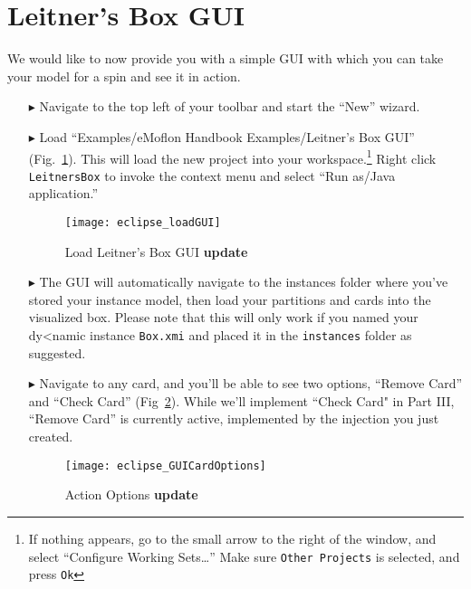 \newpage
\section{Leitner's Box GUI}
\genHeader
\hypertarget{sec:LBGUI}{}


We would like to now provide you with a simple GUI with which you can take your model for a spin and see it in action.

\begin{itemize}

\item[$\blacktriangleright$] Navigate to the top left of your toolbar and start the ``New'' wizard.

\item[$\blacktriangleright$] Load ``Examples/eMoflon Handbook Examples/Leitner's Box GUI'' (Fig.~\ref{fig:GUI_load}). This will load the new project into
your workspace.\footnote{If nothing appears, go to the small arrow to the right of the window, and select ``Configure Working Sets\ldots'' Make sure
\texttt{Other Projects} is selected, and press \texttt{Ok}} Right click \texttt{LeitnersBox} to invoke the context menu and select ``Run as/Java application.''

\begin{figure}[htbp]
    \centering
    \texttt{[image: eclipse\_loadGUI]}
    \caption{Load Leitner's Box GUI {\bf update}}
    \label{fig:GUI_load}
\end{figure}

\clearpage

\item[$\blacktriangleright$] The GUI will automatically navigate to the instances folder where you've stored your instance model, then load your partitions and
cards into the visualized box. Please note that this will only work if you named your dy<namic instance \texttt{Box.xmi} and placed it in the \texttt{instances}
folder as suggested.

\vspace{1cm}

\item[$\blacktriangleright$] Navigate to any card, and you'll be able to see two options, ``Remove Card'' and ``Check Card'' (Fig~\ref{fig:GUI_cardOptions}).
While we'll implement ``Check Card" in Part III, ``Remove Card'' is currently active, implemented by the injection you just created.

\vspace{1cm}

\begin{figure}[htbp]
    \centering
    \texttt{[image: eclipse\_GUICardOptions]}
    \caption{Action Options {\bf update}}
    \label{fig:GUI_cardOptions}
\end{figure}


\end{itemize}
